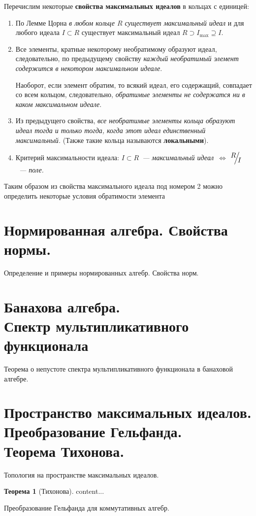 \documentclass[12pt]{extarticle}
\theoremstyle{definition}
\newtheorem{theorem}{\indent Теорема}[section]
\newcommand{\factor}[2]{\raisebox{.35em}{$#1$}\kern-.27em\Big/\kern-.27em\raisebox{-.35em}{$#2$}}
\begin{document}
    Перечислим некоторые \textbf{свойства максимальных идеалов} в кольцах с единицей:
    \begin{enumerate}
        \item По Лемме Цорна \textit{в любом кольце $R$ существует максимальный идеал} и для любого идеала $I\subset R$ существует максимальный идеал $R\supset I_{\max}\supseteq I$.
        \item Все элементы, кратные некоторому необратимому образуют идеал, следовательно, по предыдущему свойству \textit{каждый необратимый элемент  содержится в некотором максимальном идеале}.

        Наоборот, если элемент обратим, то всякий идеал, его содержащий, совпадает со всем кольцом, следовательно, \textit{обратимые элементы не содержатся ни в каком максимальном идеале}.
        \item Из предыдущего свойства, \textit{все необратимые элементы кольца образуют идеал тогда и только тогда, когда этот идеал единственный максимальный.} (Также такие кольца называются \textbf{локальными}).
        \item Критерий максимальности идеала: \textit{$I\subset R$~--- максимальный идеал~$\iff$ $\factor{R}{I}$~--- поле.}
    \end{enumerate}

    Таким образом из свойства максимального идеала под номером 2 можно определить некоторые условия обратимости элемента

    \section[Нормы и нормированные алгебры]{Нормированная алгебра. Свойства нормы.}
        Определение и примеры нормированных алгебр. Свойства норм.

    \section[Банаховы алгебры. Спектр]{Банахова алгебра.\\Спектр мультипликативного функционала}
        Теорема о непустоте спектра мультипликативного функционала в банаховой алгебре.

    \section[Пространство максимальных идеалов]{Пространство максимальных идеалов. Преобразование Гельфанда.\\Теорема Тихонова.}
        Топология на пространстве максимальных идеалов.
        \begin{theorem}[Тихонова]\label{th:Tikhonov}
            content...
        \end{theorem}
        Преобразование Гельфанда для коммутативных алгебр.
\end{document}
